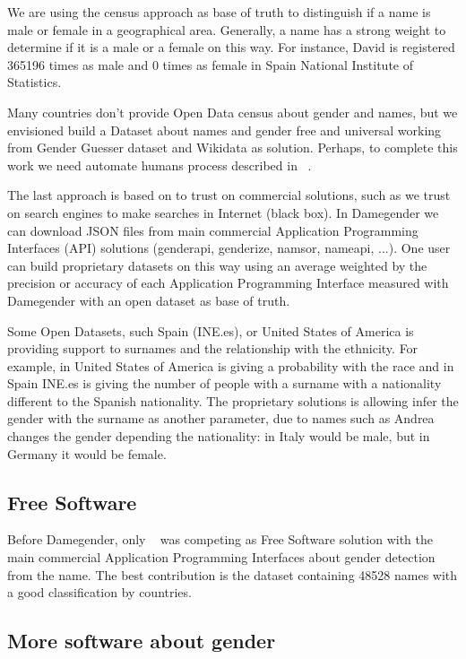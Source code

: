 \documentclass[a4paper]{article}
\begin{document}
We are using the census approach as base of truth to distinguish if a name is male or female in a geographical area. Generally, a name has a strong weight to determine if it is a male or a female on this way.
For instance, David is registered 365196 times as male and 0 times as female in Spain National Institute of Statistics.

Many countries don't provide Open Data census about gender and names, but we envisioned build a Dataset about names and gender free and universal working from Gender Guesser dataset and Wikidata as solution. 
Perhaps, to complete this work we need automate humans process described in ~\cite{10.7717/peerj-cs.156}.

The last approach is based on to trust on commercial solutions, such as we trust on search engines to make searches in Internet (black box).
In Damegender we can download JSON files from main commercial Application Programming Interfaces (API) solutions (genderapi,
genderize, namsor, nameapi, ...).
One user can build proprietary datasets on this way using an average weighted by the precision or accuracy of each Application Programming Interface measured with Damegender with an open dataset as base of truth.

Some Open Datasets, such Spain (INE.es), or United States of America is providing support to surnames and the relationship with the ethnicity. 
For example, in United States of America is giving a probability with the race and in Spain INE.es is giving the number of
people with a surname with a nationality different to the Spanish nationality.
The proprietary solutions is allowing infer the gender with the surname as another parameter, due to names such as Andrea
changes the gender depending the nationality: in Italy would be male, but in Germany it would be female.

\subsection{Free Software}

Before Damegender, only ~\cite{krawetz2006gender} was competing as Free Software solution with the main commercial Application
Programming Interfaces about gender detection from the name. 
The best contribution is the dataset containing 48528 names with a good classification by countries.

\subsection{More software about gender}
\end{document}

